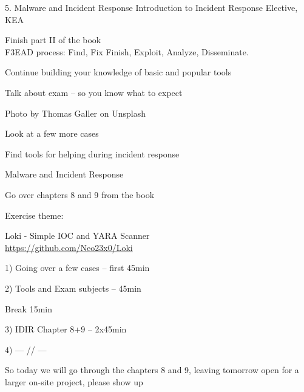 \documentclass[Screen16to9,17pt]{foils}
\begin{document}
\mytitlepage
{5. Malware and Incident Response}
{Introduction to Incident Response Elective, KEA}




\begin{list2}
\item Finish part II of the book\\
F3EAD process: Find, Fix Finish, Exploit, Analyze, Disseminate.
\item Continue building your knowledge of basic and popular tools
\item Talk about exam -- so you know what to expect
\end{list2}

{\hfill \small Photo by Thomas Galler on Unsplash}


\begin{list2}
\item Look at a few more cases
\item Find tools for helping during incident response
\item Malware and Incident Response
\item Go over chapters 8 and 9 from the book
\end{list2}

Exercise theme:
\begin{list2}
\item Loki - Simple IOC and YARA Scanner\\
\url{https://github.com/Neo23x0/Loki}
\end{list2}


\begin{list2}
\item 1) Going over a few cases -- first 45min
\item 2) Tools and Exam subjects -- 45min
\item Break 15min
\item 3) IDIR Chapter 8+9 -- 2x45min
\item 4) --- // ---
\end{list2}

So today we will go through the chapters 8 and 9, leaving tomorrow open for a larger on-site project, please show up

\end{document}
